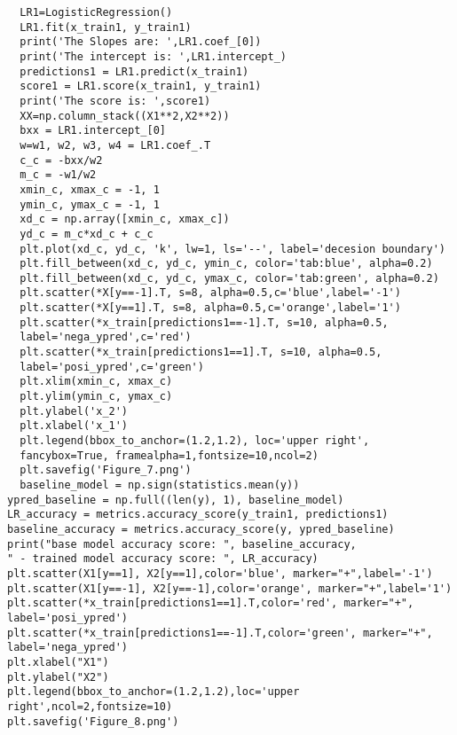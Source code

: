 \documentclass[10pt]{article}
\begin{document}
\begin{lstlisting}
  LR1=LogisticRegression()
  LR1.fit(x_train1, y_train1)
  print('The Slopes are: ',LR1.coef_[0])
  print('The intercept is: ',LR1.intercept_)
  predictions1 = LR1.predict(x_train1)
  score1 = LR1.score(x_train1, y_train1)
  print('The score is: ',score1)
  XX=np.column_stack((X1**2,X2**2))
  bxx = LR1.intercept_[0]
  w=w1, w2, w3, w4 = LR1.coef_.T
  c_c = -bxx/w2
  m_c = -w1/w2
  xmin_c, xmax_c = -1, 1
  ymin_c, ymax_c = -1, 1
  xd_c = np.array([xmin_c, xmax_c])
  yd_c = m_c*xd_c + c_c
  plt.plot(xd_c, yd_c, 'k', lw=1, ls='--', label='decesion boundary')
  plt.fill_between(xd_c, yd_c, ymin_c, color='tab:blue', alpha=0.2)
  plt.fill_between(xd_c, yd_c, ymax_c, color='tab:green', alpha=0.2)
  plt.scatter(*X[y==-1].T, s=8, alpha=0.5,c='blue',label='-1')
  plt.scatter(*X[y==1].T, s=8, alpha=0.5,c='orange',label='1')
  plt.scatter(*x_train[predictions1==-1].T, s=10, alpha=0.5, 
  label='nega_ypred',c='red')
  plt.scatter(*x_train[predictions1==1].T, s=10, alpha=0.5,
  label='posi_ypred',c='green')
  plt.xlim(xmin_c, xmax_c)
  plt.ylim(ymin_c, ymax_c)
  plt.ylabel('x_2')
  plt.xlabel('x_1')
  plt.legend(bbox_to_anchor=(1.2,1.2), loc='upper right', 
  fancybox=True, framealpha=1,fontsize=10,ncol=2)
  plt.savefig('Figure_7.png')
  baseline_model = np.sign(statistics.mean(y))
ypred_baseline = np.full((len(y), 1), baseline_model)
LR_accuracy = metrics.accuracy_score(y_train1, predictions1)
baseline_accuracy = metrics.accuracy_score(y, ypred_baseline)
print("base model accuracy score: ", baseline_accuracy,
" - trained model accuracy score: ", LR_accuracy)
plt.scatter(X1[y==1], X2[y==1],color='blue', marker="+",label='-1')
plt.scatter(X1[y==-1], X2[y==-1],color='orange', marker="+",label='1')
plt.scatter(*x_train[predictions1==1].T,color='red', marker="+",
label='posi_ypred')
plt.scatter(*x_train[predictions1==-1].T,color='green', marker="+",
label='nega_ypred')
plt.xlabel("X1")
plt.ylabel("X2")
plt.legend(bbox_to_anchor=(1.2,1.2),loc='upper right',ncol=2,fontsize=10)
plt.savefig('Figure_8.png')
\end{lstlisting}
\end{document}
